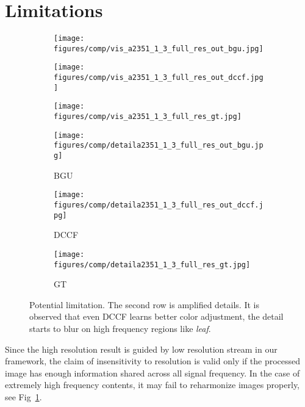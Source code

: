 \documentclass[runningheads]{llncs}
\begin{document}
\section{Limitations}
\label{sec:limitation}

\begin{figure}[htbp]
  \centering
  
  \begin{subfigure}[t]{0.3\linewidth}
  \centering
  \texttt{[image: figures/comp/vis\_a2351\_1\_3\_full\_res\_out\_bgu.jpg]}
\end{subfigure}
  \begin{subfigure}[t]{0.3\linewidth}
  \centering
  \texttt{[image: figures/comp/vis\_a2351\_1\_3\_full\_res\_out\_dccf.jpg]}
\end{subfigure}
  \begin{subfigure}[t]{0.3\linewidth}
  \centering
  \texttt{[image: figures/comp/vis\_a2351\_1\_3\_full\_res\_gt.jpg]}
\end{subfigure}


  \begin{subfigure}[t]{0.3\linewidth}
    \centering
    \texttt{[image: figures/comp/detaila2351\_1\_3\_full\_res\_out\_bgu.jpg]}
    \caption{BGU~\cite{chen2016bilateral}}
    \end{subfigure}
    \begin{subfigure}[t]{0.3\linewidth}
    \centering
    \texttt{[image: figures/comp/detaila2351\_1\_3\_full\_res\_out\_dccf.jpg]}
    \caption{DCCF}
    \end{subfigure}
    \begin{subfigure}[t]{0.3\linewidth}
    \centering
    \texttt{[image: figures/comp/detaila2351\_1\_3\_full\_res\_gt.jpg]}
    \caption{GT}
    \end{subfigure}
  
  \caption{Potential limitation. The second row is amplified details. It is observed that even DCCF learns better color adjustment, the detail starts to blur on high frequency regions like \textit{leaf}.}
  
  \label{fig:limitation}
  \end{figure}

Since the high resolution result is guided by low resolution stream in our framework, the claim of insensitivity to resolution is valid only if the processed image has enough information shared across all signal frequency. 
In the case of extremely high frequency contents, it may fail to reharmonize images properly, see Fig~\ref{fig:limitation}.
\end{document}
